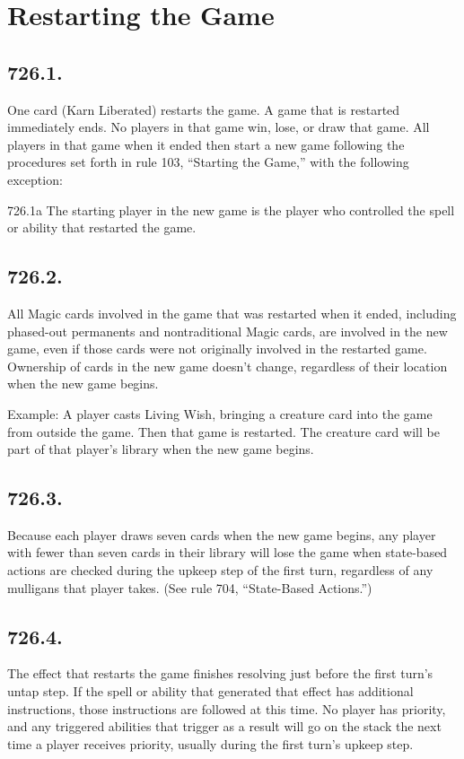 \section{Restarting the Game}
\subsection*{726.1.}
One card (Karn Liberated) restarts the game. A game that is restarted immediately ends. No players in that game win, lose, or draw that game. All players in that game when it ended then start a new game following the procedures set forth in rule 103, “Starting the Game,” with the following exception:

726.1a The starting player in the new game is the player who controlled the spell or ability that restarted the game.

\subsection*{726.2.}
All Magic cards involved in the game that was restarted when it ended, including phased-out permanents and nontraditional Magic cards, are involved in the new game, even if those cards were not originally involved in the restarted game. Ownership of cards in the new game doesn’t change, regardless of their location when the new game begins.

Example: A player casts Living Wish, bringing a creature card into the game from outside the game. Then that game is restarted. The creature card will be part of that player’s library when the new game begins.

\subsection*{726.3.}
Because each player draws seven cards when the new game begins, any player with fewer than seven cards in their library will lose the game when state-based actions are checked during the upkeep step of the first turn, regardless of any mulligans that player takes. (See rule 704, “State-Based Actions.”)

\subsection*{726.4.}
The effect that restarts the game finishes resolving just before the first turn’s untap step. If the spell or ability that generated that effect has additional instructions, those instructions are followed at this time. No player has priority, and any triggered abilities that trigger as a result will go on the stack the next time a player receives priority, usually during the first turn’s upkeep step.

